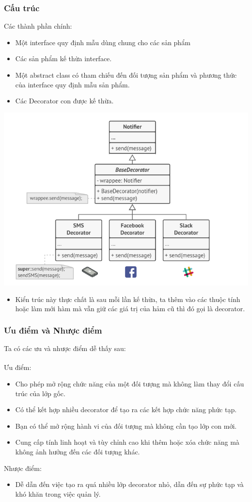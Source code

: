 \subsubsection{Cấu trúc}
Các thành phần chính:
\begin{itemize}
    \item Một interface quy định mẫu dùng chung cho các sản phẩm
    \item Các sản phẩm kế thừa interface.
    \item Một abstract class có tham chiếu đến đối tượng sản phẩm và phương thức của interface quy định mẫu sản phẩm.
    \item Các Decorator con được kế thừa.
\end{itemize}
\begin{center}
    \includegraphics[scale=0.6]{image/structural/decorator.png}
\end{center}
\begin{itemize}
    \item Kiển trúc này thực chất là sau mỗi lần kế thừa, ta thêm vào các thuộc tính hoặc làm mới hàm mà vẫn giữ các giá trị của hảm cũ thì đó gọi là decorator.
\end{itemize}
\subsubsection{Ưu điểm và Nhược điểm}
Ta có các ưu và nhược điểm dễ thấy sau:\\\\
Ưu điểm:
\begin{itemize}
    \item Cho phép mở rộng chức năng của một đối tượng mà không làm thay đổi cấu trúc của lớp gốc.
    \item Có thể kết hợp nhiều decorator để tạo ra các kết hợp chức năng phức tạp.
    \item Bạn có thể mở rộng hành vi của đối tượng mà không cần tạo lớp con mới.
    \item Cung cấp tính linh hoạt và tùy chỉnh cao khi thêm hoặc xóa chức năng mà không ảnh hưởng đến các đối tượng khác.
\end{itemize}
Nhược điểm:
\begin{itemize}
    \item Dễ dẫn đến việc tạo ra quá nhiều lớp decorator nhỏ, dẫn đến sự phức tạp và khó khăn trong việc quản lý.
\end{itemize}
